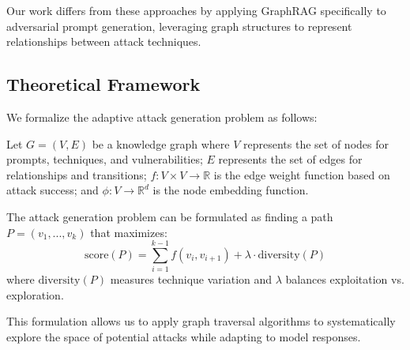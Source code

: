 Our work differs from these approaches by applying GraphRAG specifically to adversarial prompt generation, leveraging graph structures to represent relationships between attack techniques.

\subsection{Theoretical Framework}
We formalize the adaptive attack generation problem as follows:

Let \(G = (V, E)\) be a knowledge graph where \(V\) represents the set of nodes for prompts, techniques, and vulnerabilities; \(E\) represents the set of edges for relationships and transitions; \(f: V \times V \rightarrow \mathbb{R}\) is the edge weight function based on attack success; and \(\phi: V \rightarrow \mathbb{R}^d\) is the node embedding function.

The attack generation problem can be formulated as finding a path \(P = (v_1, ..., v_k)\) that maximizes:
\[
\text{score}(P) = \sum_{i=1}^{k-1} f(v_i, v_{i+1}) + \lambda \cdot \text{diversity}(P)
\]
where \(\text{diversity}(P)\) measures technique variation and \(\lambda\) balances exploitation vs. exploration.

This formulation allows us to apply graph traversal algorithms to systematically explore the space of potential attacks while adapting to model responses. 